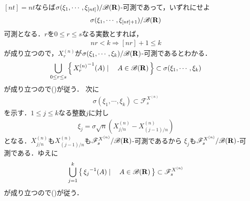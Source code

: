 \begin{sketch}
		$[nt] = nt$ならば$\sigma(\xi_1,\cdots,\xi_{[nt]})/\mathscr{B}(\mathbf{R})$-可測であって，いずれにせよ
		\begin{align}
			\sigma(\xi_1,\cdots,\xi_{[nt]+1})/\mathscr{B}(\mathbf{R})
		\end{align}
		可測となる．$r$を$0 \leq r \leq s$なる実数とすれば，
		\begin{align}
			nr < k \Longrightarrow [nr] + 1 \leq k
		\end{align}
		が成り立つので，$X^{(n)}_r$が$\sigma(\xi_1,\cdots,\xi_{k})/\mathscr{B}(\mathbf{R})$-可測であるとわかる．
		\begin{align}
			\bigcup_{0 \leq r \leq s} \left\{\, {X^{(n)}_r}^{-1}(A) \mid \quad A \in \mathscr{B}(\mathbf{R})\, \right\}
			\subset \sigma(\xi_1,\cdots,\xi_{k})
		\end{align}
		が成り立つので()が従う．
		次に
		\begin{align}
			\sigma(\xi_1,\cdots,\xi_k) \subset \mathscr{F}_s^{X^{(n)}} 
			\label{The_Invariance_Principle_and_the_Wiener_Measure_2}
		\end{align}
		を示す．$1 \leq j \leq k$なる整数$j$に対し
		\begin{align}
			\xi_j = \sigma \sqrt{n} \left(X^{(n)}_{j/n} - X^{(n)}_{(j-1)/n} \right)
		\end{align}
		となる．$X^{(n)}_{j/n}$も$X^{(n)}_{(j-1)/n}$も$\mathscr{F}_s^{X^{(n)}}/\mathscr{B}(\mathbf{R})$-可測であるから
		$\xi_j$も$\mathscr{F}_s^{X^{(n)}}/\mathscr{B}(\mathbf{R})$-可測である．ゆえに
		\begin{align}
			\bigcup_{j=1}^k \left\{\, {\xi_j}^{-1}(A) \mid \quad A \in \mathscr{B}(\mathbf{R})\, \right\}
			\subset \mathscr{F}_s^{X^{(n)}}
		\end{align}
		が成り立つので()が従う．
		\QED
	\end{sketch}